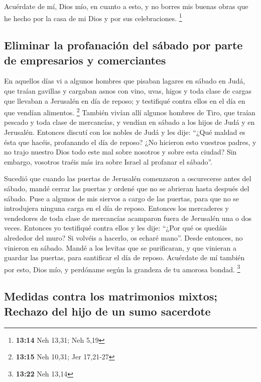 \begin{paracol}{2}
 Acuérdate de mí, Dios mío, en cuanto a esto, y no borres
mis buenas obras que he hecho por la casa de mi Dios y por sus
celebraciones. \footnote{\textbf{13:14} Neh 13,31; Neh 5,19}

\hypertarget{eliminar-la-profanaciuxf3n-del-suxe1bado-por-parte-de-empresarios-y-comerciantes}{%
\subsection{Eliminar la profanación del sábado por parte de empresarios
y
comerciantes}\label{eliminar-la-profanaciuxf3n-del-suxe1bado-por-parte-de-empresarios-y-comerciantes}}

 En aquellos días vi a algunos hombres que pisaban
lagares en sábado en Judá, que traían gavillas y cargaban asnos con
vino, uvas, higos y toda clase de cargas que llevaban a Jerusalén en día
de reposo; y testifiqué contra ellos en el día en que vendían alimentos.
\footnote{\textbf{13:15} Neh 10,31; Jer 17,21-27} 
También vivían allí algunos hombres de Tiro, que traían pescado y toda
clase de mercancías, y vendían en sábado a los hijos de Judá y en
Jerusalén.  Entonces discutí con los nobles de Judá y les
dije: ``¿Qué maldad es ésta que hacéis, profanando el día de reposo?
 ¿No hicieron esto vuestros padres, y no trajo nuestro
Dios todo este mal sobre nosotros y sobre esta ciudad? Sin embargo,
vosotros traéis más ira sobre Israel al profanar el sábado''.

 Sucedió que cuando las puertas de Jerusalén comenzaron a
oscurecerse antes del sábado, mandé cerrar las puertas y ordené que no
se abrieran hasta después del sábado. Puse a algunos de mis siervos a
cargo de las puertas, para que no se introdujera ninguna carga en el día
de reposo.  Entonces los mercaderes y vendedores de toda
clase de mercancías acamparon fuera de Jerusalén una o dos veces.
 Entonces yo testifiqué contra ellos y les dije: ``¿Por
qué os quedáis alrededor del muro? Si volvéis a hacerlo, os echaré
mano''. Desde entonces, no vinieron en sábado.  Mandé a
los levitas que se purificaran, y que vinieran a guardar las puertas,
para santificar el día de reposo. Acuérdate de mí también por esto, Dios
mío, y perdóname según la grandeza de tu amorosa bondad. \footnote{\textbf{13:22}
  Neh 13,14}

\hypertarget{medidas-contra-los-matrimonios-mixtos-rechazo-del-hijo-de-un-sumo-sacerdote}{%
\subsection{Medidas contra los matrimonios mixtos; Rechazo del hijo de
un sumo
sacerdote}\label{medidas-contra-los-matrimonios-mixtos-rechazo-del-hijo-de-un-sumo-sacerdote}}


\end{paracol}
